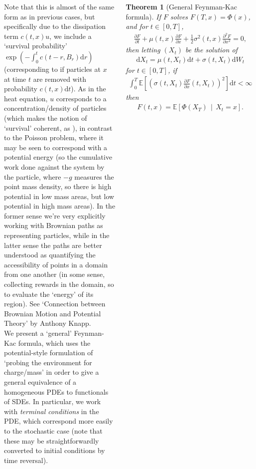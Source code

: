 \documentclass{tikzposter} %
\newcommand\E[1]{\mathbb{E}\left[#1\right]}
\newcommand\pdiff[2]{\ensuremath{\frac{\partial #1}{\partial #2}}}
\newcommand\pkdiff[3]{\ensuremath{\frac{\partial^{#1} #2}{\partial #3^{#1}}}}
\newtheorem{theorem}{Theorem}
\begin{document}
\begin{columns}
{{    Note that this is almost of the same form as in previous cases, but specifically due to the dissipation term $c(t, x)u$, we include a `survival probability' $\exp\left(-\int_0^t c(t-r, B_r) \mathrm{d}r\right)$ (corresponding to if particles at $x$ at time $t$ are removed with probability $c(t, x) \mathrm{d}t$). As in the heat equation, $u$ corresponds to a concentration/density of particles (which makes the notion of `survival' coherent, as ), in contrast to the Poisson problem, where it may be seen to correspond with a potential energy (so the cumulative work done against the system by the particle, where $-g$ measures the point mass density, so there is high potential in low mass areas, but low potential in high mass areas). In the former sense we're very explicitly working with Brownian paths as representing particles, while in the latter sense the paths are better understood as quantifying the accessibility of points in a domain from one another (in some sense, collecting rewards in the domain, so to evaluate the `energy' of its region). See `Connection between Brownian Motion and Potential Theory' by Anthony Knapp. \\


    We present a `general' Feynman-Kac formula, which uses the potential-style formulation of `probing the environment for charge/mass' in order to give a general equivalence of a homogeneous PDEs to functionals of SDEs. In particular, we work with \emph{terminal conditions} in the PDE, which correspond more easily to the stochastic case (note that these may be straightforwardly converted to initial conditions by time reversal).
      \begin{theorem}[General Feynman-Kac formula]
        If $F$ solves $F(T, x) = \Phi(x)$, and for $t \in [0, T]$,
        \begin{align*}
          \pdiff{F}{t} + \mu(t, x) \pdiff{F}{x} + \frac{1}{2} \sigma^2(t, x) \pkdiff{2}{F}{x} = 0,
        \end{align*}
        then letting $(X_t)$ be the solution of
        \begin{align*}
          \mathrm{d}X_t = \mu(t, X_t) \mathrm{d}t + \sigma(t, X_t) \mathrm{d}W_t
        \end{align*}
        for $t \in [0, T]$, if
        \begin{align*}
          \int_0^T \E{\left(\sigma(t, X_t) \pdiff{F}{x}(t, X_t)\right)^2} \mathrm{d}t < \infty
        \end{align*}
        then
        \begin{align*}
          F(t, x) = \mathbb{E}\left[\Phi(X_T) \,\middle|\, X_t = x\right].
        \end{align*}
    \end{theorem}
    \hphantom{}

}}
\end{columns}
\end{document}
